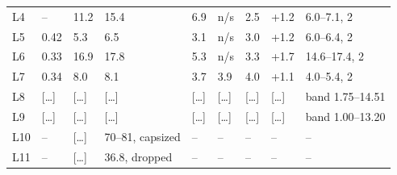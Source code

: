 \begin{table}[htbp]
\begin{tabularx}{\textwidth}{lYYYYYYYY}
    L4 & -- & 11.2 & 15.4 & 6.9 & n/s & 2.5 & +1.2 & 6.0--7.1, 2 \\ %
    L5 & 0.42 & 5.3 & 6.5 & 3.1 & n/s & 3.0 & +1.2 & 6.0--6.4, 2 \\ %
    L6 & 0.33 & 16.9 & 17.8 & 5.3 & n/s & 3.3 & +1.7 & 14.6--17.4, 2 \\ %
    L7 & 0.34 & 8.0 & 8.1 & 3.7 & 3.9 & 4.0 & +1.1 & 4.0--5.4, 2 \\ %
    L8 & [\dots] & [\dots] & [\dots] & [\dots] & [\dots] & [\dots] & [\dots] & band 1.75--14.51 \\
    L9 & [\dots] & [\dots] & [\dots] & [\dots] & [\dots] & [\dots] & [\dots] & band 1.00--13.20 \\
    L10 & -- & [\dots] & 70--81, capsized & -- & -- & -- & -- & -- \\ %
    L11 & -- & [\dots] & 36.8, dropped & -- & -- & -- & -- & -- \\ %
    \bottomrule
  \end{tabularx}
\end{table}





